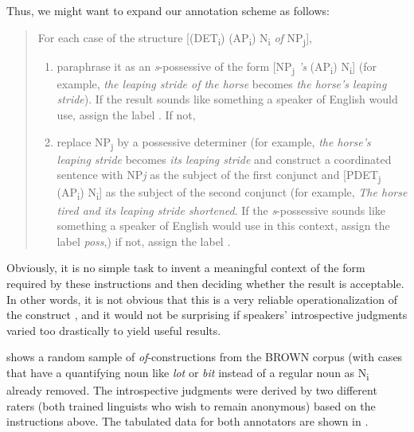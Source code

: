 Thus, we might want to expand our annotation scheme as follows:\pagebreak\largerpage

\begin{quote}
For each case of the structure [(DET\textsubscript{i}) (AP\textsubscript{i}) N\textsubscript{i} \textit{of} NP\textsubscript{j}],
\begin{enumerate}
\item paraphrase it as an \textit{s}-possessive  of the form [NP\textsubscript{j} \textit{'s} (AP\textsubscript{i}) N\textsubscript{i}] (for example, \textit{the leaping stride of the horse} becomes \textit{the horse's leaping stride}). If the result sounds like something a speaker of English would use, assign the label . If not,
\item replace NP\textsubscript{j} by a possessive determiner  (for example, \textit{the horse's leaping stride} becomes \textit{its leaping stride} and construct a coordinated  sentence with NP\textit{j} as the subject of the first conjunct  and [PDET\textsubscript{j} (AP\textsubscript{i}) N\textsubscript{i}] as the subject of the second conjunct (for example, \textit{The horse tired and its leaping stride shortened}. If the \textit{s}-possessive  sounds like something a speaker of English would use in this context, assign the label \textit{poss},) if not, assign the label .
\end{enumerate}
\end{quote}

Obviously, it is no simple task to invent a meaningful  context of the form required by these instructions and then deciding whether the result is acceptable.  In other words, it is not obvious that this is a very reliable  operationalization  of the construct ,  and it would not be surprising if speakers' introspective  judgments varied too drastically to yield useful results.

  shows a random sample of \textit{of}-constructions from the BROWN  corpus (with cases that have a quantifying noun  like \textit{lot} or \textit{bit} instead of a regular noun as N\textsubscript{i} already removed. The introspective  judgments were derived by two different raters (both trained linguists who wish to remain anonymous) based on the instructions above. The tabulated data for both annotators  are shown in .

